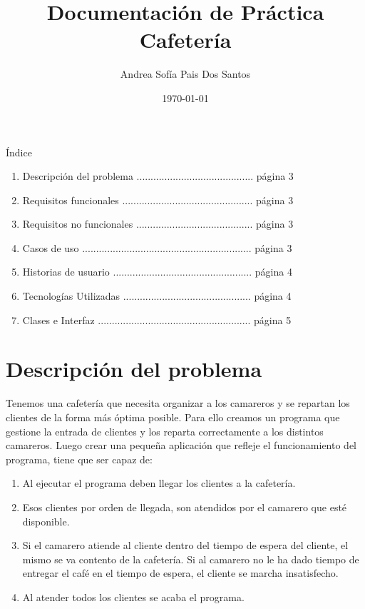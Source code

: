 \documentclass[a4paper,12pt]{article}
\title{Documentación de Práctica Cafetería}
\author{Andrea Sofía Pais Dos Santos}
\date{\today}
\begin{document}
\setlength{\droptitle}{0.4\textheight} 
\maketitle
\thispagestyle{empty}
\newpage 


\vspace{5cm}
Índice

\begin{enumerate}
    \item Descripción del problema .......................................... página 3
    \item Requisitos funcionales ............................................... página 3
    \item Requisitos no funcionales .......................................... página 3
    \item Casos de uso ............................................................. página 3
    \item Historias de usuario .................................................. página 4
    \item Tecnologías Utilizadas .............................................. página 4
    \item Clases e Interfaz ....................................................... página 5
\end{enumerate}
\newpage


\section{Descripción del problema}
Tenemos una cafetería que necesita organizar a los camareros y se repartan los clientes de la forma más óptima posible. Para ello creamos 
un programa que gestione la entrada de clientes y los reparta correctamente a los distintos camareros. Luego crear una pequeña aplicación
que refleje el funcionamiento del programa, tiene que ser capaz de:
\begin{enumerate}
\item Al ejecutar el programa deben llegar los clientes a la cafetería.
\item Esos clientes por orden de llegada, son atendidos por el camarero que esté disponible.
\item Si el camarero atiende al cliente dentro del tiempo de espera del cliente, el mismo se va contento de la cafetería. Si al camarero no le ha dado tiempo de entregar el café en el tiempo de espera, el cliente se marcha insatisfecho.
\item Al atender todos los clientes se acaba el programa.
\end{enumerate}
\end{document}
